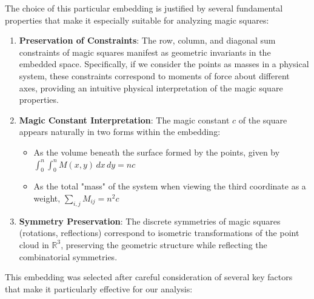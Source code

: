 The choice of this particular embedding is justified by several fundamental properties that make it especially suitable for analyzing magic squares:

\begin{enumerate}
    \item \textbf{Preservation of Constraints}: The row, column, and diagonal sum constraints of magic squares manifest as geometric invariants in the embedded space. Specifically, if we consider the points as masses in a physical system, these constraints correspond to moments of force about different axes, providing an intuitive physical interpretation of the magic square properties.
    
    \item \textbf{Magic Constant Interpretation}: The magic constant $c$ of the square appears naturally in two forms within the embedding:
        \begin{itemize}
            \item As the volume beneath the surface formed by the points, given by $\int_0^n \int_0^n M(x,y) \, dx \, dy = nc$
            \item As the total "mass" of the system when viewing the third coordinate as a weight, $\sum_{i,j} M_{ij} = n^2c$
        \end{itemize}
        
    \item \textbf{Symmetry Preservation}: The discrete symmetries of magic squares (rotations, reflections) correspond to isometric transformations of the point cloud in $\mathbb{R}^3$, preserving the geometric structure while reflecting the combinatorial symmetries.
\end{enumerate}

This embedding was selected after careful consideration of several key factors that make it particularly effective for our analysis:

